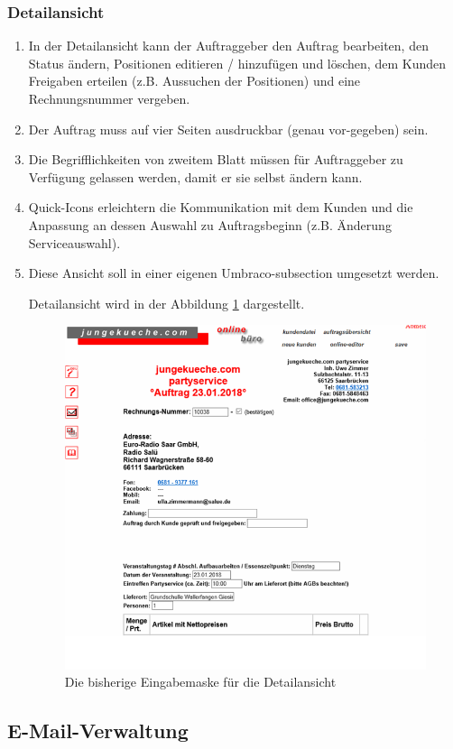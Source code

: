 \subsubsection{Detailansicht}

\begin{enumerate}
	\item In der Detailansicht kann der Auftraggeber den Auftrag bearbeiten, den Status ändern, Positionen editieren / hinzufügen und löschen, dem Kunden Freigaben erteilen (z.B. Aussuchen der Positionen) und eine Rechnungsnummer vergeben.
	\item Der Auftrag muss auf vier Seiten ausdruckbar (genau vor-gegeben) sein.
	\item Die Begrifflichkeiten von zweitem Blatt müssen für Auftraggeber zu Verfügung gelassen werden, damit er sie selbst ändern kann.
	\item Quick-Icons erleichtern die Kommunikation mit dem Kunden und die Anpassung an dessen Auswahl zu Auftragsbeginn (z.B. Änderung Serviceauswahl).
	\item  Diese Ansicht soll in einer eigenen Umbraco-subsection umgesetzt werden.
	
	Detailansicht wird in der Abbildung \ref{fig:Detailansicht} dargestellt.
	\begin{figure}[h]
		\centering
		\includegraphics[width=0.7\linewidth]{Graphics/detailansichtt.png}
		\caption[Detailansicht]{Die bisherige Eingabemaske für die Detailansicht}
		\label{fig:Detailansicht}
	\end{figure}
\end{enumerate} 


\subsection{E-Mail-Verwaltung}


